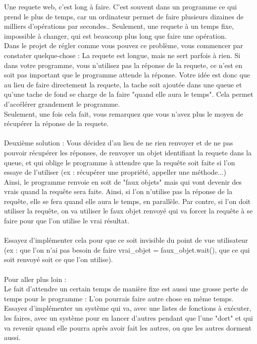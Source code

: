 \documentclass[12pt]{article}
\begin{document}
Une requete web, c'est long à faire. C'est souvent dans un programme ce qui prend le plus de temps, car un ordinateur permet de faire plusieurs dizaines de milliers d'opérations par secondes.. Seulement, une requete à un temps fixe, impossible à changer, qui est beaucoup plus long que faire une opération.\\
Dans le projet de régler comme vous pouvez ce problème, vous commencer par constater quelque-chose : La requete est longue, mais ne sert parfois à rien. Si dans votre programme, vous n'utilisez pas la réponse de la requete, ce n'est en soit pas important que le programme attende la réponse. Votre idée est donc que au lieu de faire directement la requete, la tache soit ajoutée dans une queue et qu'une tache de fond se charge de la faire "quand elle aura le temps". Cela permet d'accélérer grandement le programme.\\
Seulement, une fois cela fait, vous remarquez que vous n'avez plus le moyen de récupérer la réponse de la requete.
\\\\
Deuxième solution : Vous décidez d'au lieu de ne rien renvoyer et de ne pas pouvoir récupérer les réponses, de renvoyer un objet identifiant la requete dans la queue, et qui oblige le programme à attendre que la requête soit faite si l'on essaye de l'utiliser (ex : récupérer une propriété, appeller une méthode...)\\
Ainsi, le programme renvoie en soit de "faux objets" mais qui vont devenir des vrais quand la requête sera faite. Ainsi, si l'on n'utilise pas la réponse de la requête, elle se fera quand elle aura le temps, en parallèle. Par contre, si l'on doit utiliser la requête, on va utiliser le faux objet renvoyé qui va forcer la requête à se faire pour que l'on utilise le vrai résultat.
\\\\
Essayez d'implémenter cela pour que ce soit invisible du point de vue utilisateur (ex : que l'on n'ai pas besoin de faire vrai\_objet = faux\_objet.wait(), que ce qui soit renvoyé soit ce que l'on utilise).
\\\\
Pour aller plus loin :\\
Le fait d'attendre un certain temps de manière fixe est aussi une grosse perte de temps pour le programme : L'on pourrais faire autre chose en même temps. Essayez d'implémenter un système qui va, avec une listes de fonctions à exécuter, les faires, avec un système pour en lancer d'autres pendant que l'une "dort" et qui va revenir quand elle pourra après avoir fait les autres, ou que les autres dorment aussi.
\end{document}
